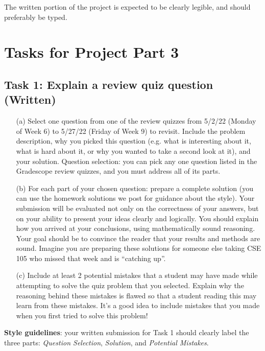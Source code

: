 The written portion of the project is expected to be clearly legible, and should preferably be typed.

 \newpage
 \section*{Tasks for Project Part 3}

 \subsection*{Task 1: Explain a review quiz question (Written)}
	
	\begin{enumerate}
		\item[(a)] Select one question from one of the review quizzes from 5/2/22 (Monday of Week 6) to 5/27/22  (Friday of Week 9) to revisit.
		Include the problem description, why you picked this question (e.g. what is interesting about it, what is hard about it, 
		or why you wanted to take a second look at it), and your solution. Question selection: 
		you can pick any one question listed in the Gradescope review quizzes, and you must address 
		all  of its parts. 
 		\item[(b)] For each part of your chosen question: prepare a complete solution 
		 (you can use the homework solutions we post for guidance about the style). 
		 Your submission will be evaluated not only on the correctness of your answers, 
		 but on your ability to present your ideas clearly and logically. You should explain how you arrived at your conclusions, 
		 using mathematically sound reasoning. Your goal should be to convince the reader that your results and 
		 methods are sound. Imagine you are preparing these solutions for someone else taking 
		 CSE 105 who missed that week and is “catching up”.
 
 		\item[(c)] Include at least 2 potential mistakes that a student may have made while attempting to solve the quiz 
		 problem that you selected. Explain why the reasoning behind these mistakes is flawed so that 
		 a student reading this may learn from these mistakes. It's a good idea to include mistakes that you made 
		 when you first tried to solve this problem!	
	\end{enumerate}
	
	{\bf Style guidelines}: your written submission for Task 1 should clearly label the three parts:
	{\it Question Selection}, {\it Solution},  and {\it Potential Mistakes}.

